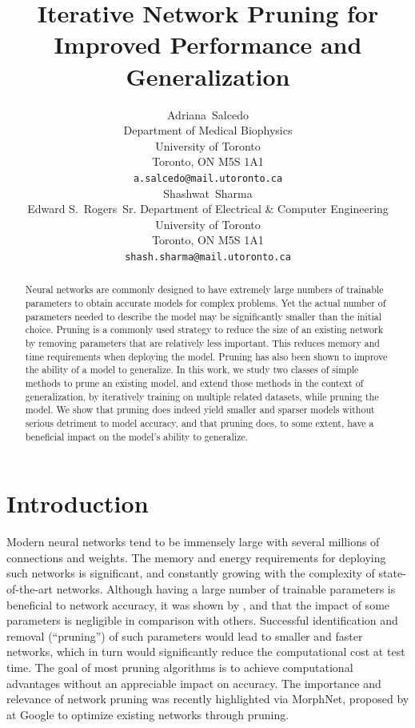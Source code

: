 \documentclass{article}
\title{Iterative Network Pruning for Improved Performance and Generalization}
\author{%
  Adriana~Salcedo\\
  Department of Medical Biophysics\\
  University of Toronto\\
  Toronto, ON M5S 1A1\\
  \texttt{a.salcedo@mail.utoronto.ca} \\
   \And
   Shashwat~Sharma\\
   Edward S.~Rogers~Sr. Department of Electrical \& Computer Engineering \\
   University of Toronto\\
   Toronto, ON M5S 1A1\\
   \texttt{shash.sharma@mail.utoronto.ca} \\
}
\begin{document}

\maketitle

\begin{abstract}
  Neural networks are commonly designed to have extremely large numbers of trainable parameters to obtain accurate models for complex problems. Yet the actual number of parameters needed to describe the model may be significantly smaller than the initial choice. Pruning is a commonly used strategy to reduce the size of an existing network by removing parameters that are relatively less important. This reduces memory and time requirements when deploying the model. Pruning has also been shown to improve the ability of a model to generalize. In this work, we study two classes of simple methods to prune an existing model, and extend those methods in the context of generalization, by iteratively training on multiple related datasets, while pruning the model. We show that pruning does indeed yield smaller and sparser models without serious detriment to model accuracy, and that pruning does, to some extent, have a beneficial impact on the model's ability to generalize.
\end{abstract}

\section{Introduction}

Modern neural networks tend to be immensely large with several millions of connections and weights. The memory and energy requirements for deploying such networks is significant, and constantly growing with the complexity of state-of-the-art networks. Although having a large number of trainable parameters is beneficial to network accuracy, it was shown by \citet{NIPS_learning_weights_pruning}, \citet{OBD} and \citet{OBS} that the impact of some parameters is negligible in comparison with others. Successful identification and removal (``pruning'') of such parameters would lead to smaller and faster networks, which in turn would significantly reduce the computational cost at test time. The goal of most pruning algorithms is to achieve computational advantages without an appreciable impact on accuracy. The importance and relevance of network pruning was recently highlighted via MorphNet, proposed by \citet{morphnet} at Google to optimize existing networks through pruning.
\end{document}
